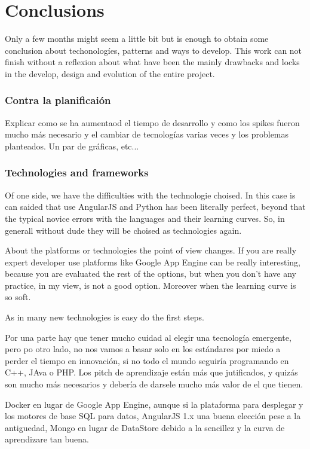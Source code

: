 \chapter{Conclusions}

Only a few months might seem a little bit but  is enough to obtain some
conclusion about techonologíes, patterns and ways to develop.
This work can not finish without a reflexion about what have been the mainly
drawbacks and locks in the develop, design and evolution of the entire project.


\subsection{Contra la planificaión}

Explicar como se ha aumentaod el tiempo de desarrollo y como los spikes
fueron mucho más necesario y el cambiar de tecnologías varias veces y los
problemas planteados. Un par de gráficas, etc...

\subsection{Technologies and frameworks}

Of one side, we have the difficulties with the technologie choised. In this case
 is can saided that use AngularJS and Python has been literally perfect, beyond
 that the typical novice errors with the languages and their learning curves.
 So, in generall without dude they will be choised as technologies again.

 About the platforms or technologies the point of view changes. If you are
 really expert developer use platforms like Google App Engine can be really
 interesting, because you are evaluated the rest of the options, but when
 you don't have any practice, in my view, is not a good option. Moreover when
 the learning curve is so soft.

 As in many new technologies is easy do the first steps.


 Por una parte hay que tener mucho cuidad al elegir una tecnología emergente,
 pero po otro lado, no nos vamos a basar solo en los estándares por miedo
a perder el tiempo en innovación, si no todo el mundo seguiría programando en
C++, JAva o PHP.
Los pitch de aprendizaje están más que jutificados, y quizás son mucho más necesarios
y debería de darsele mucho más valor de el que tienen.

Docker en lugar de Google App Engine, aunque si la plataforma para desplegar y los motores de base SQL para datos,
AngularJS 1.x una buena elección pese a la antiguedad,  Mongo en lugar de DataStore debido a la
sencillez y la curva de aprendizare tan buena.


